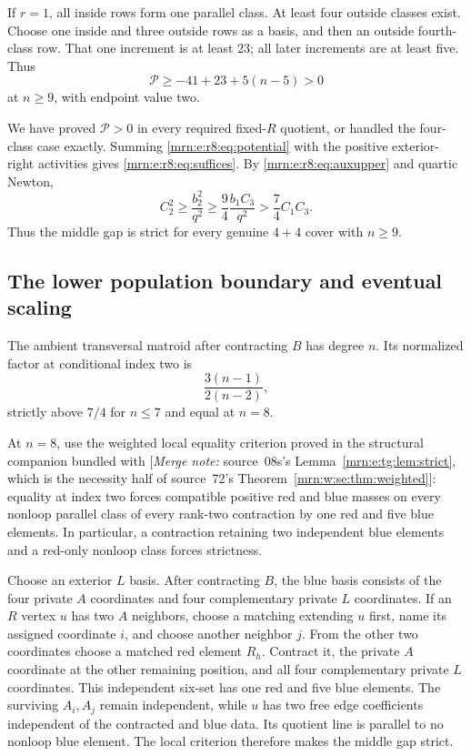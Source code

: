 \documentclass[11pt,a4paper]{article}
\theoremstyle{remark}\newtheorem{remark}[theorem]{Remark}
\newcommand{\mnote}[1]{[\textit{Merge note:} #1]}
\begin{document}
If $r=1$, all inside rows form one parallel class. At least four outside classes exist. Choose one inside and three outside rows as a basis, and then an outside fourth-class row. That one increment is at least 23; all later increments are at least five. Thus
\[
 \mathcal P\ge-41+23+5(n-5)>0
\]
at $n\ge9$, with endpoint value two.

We have proved $\mathcal P>0$ in every required fixed-$R$ quotient, or handled the four-class case exactly. Summing \eqref{mrn:e:r8:eq:potential} with the positive exterior-right activities gives \eqref{mrn:e:r8:eq:suffices}. By \eqref{mrn:e:r8:eq:auxupper} and quartic Newton,
\[
 C_2^2\ge\frac{b_2^2}{q^2}\ge\frac94\frac{b_1C_3}{q^2}
 >\frac74C_1C_3.
\]
Thus the middle gap is strict for every genuine $4+4$ cover with $n\ge9$.

\subsection{The lower population boundary and eventual scaling}
The ambient transversal matroid after contracting $B$ has degree $n$. Its normalized factor at conditional index two is
\[
 \frac{3(n-1)}{2(n-2)},
\]
strictly above $7/4$ for $n\le7$ and equal at $n=8$.

At $n=8$, use the weighted local equality criterion proved in the structural companion bundled with \cite{b:m03} \mnote{source~08s's Lemma~\ref{mrn:e:tg:lem:strict}, which is the necessity half of source~72's Theorem~\ref{mrn:w:se:thm:weighted}}: equality at index two forces compatible positive red and blue masses on every nonloop parallel class of every rank-two contraction by one red and five blue elements. In particular, a contraction retaining two independent blue elements and a red-only nonloop class forces strictness.

Choose an exterior $L$ basis. After contracting $B$, the blue basis consists of the four private $A$ coordinates and four complementary private $L$ coordinates. If an $R$ vertex $u$ has two $A$ neighbors, choose a matching extending $u$ first, name its assigned coordinate $i$, and choose another neighbor $j$. From the other two coordinates choose a matched red element $R_h$. Contract it, the private $A$ coordinate at the other remaining position, and all four complementary private $L$ coordinates. This independent six-set has one red and five blue elements. The surviving $A_i,A_j$ remain independent, while $u$ has two free edge coefficients independent of the contracted and blue data. Its quotient line is parallel to no nonloop blue element. The local criterion therefore makes the middle gap strict.
\end{document}
